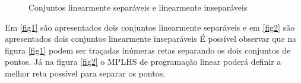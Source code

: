 \begin{figure}[!h]
\centering
{}
\qquad
{}
\label{img:linear_sepa}
\caption{Conjuntos linearmente separáveis e linearmente inseparáveis}
\end{figure}

Em \ref{fig1} são apresentados dois conjuntos linearmente separáveis e em \ref{fig2} são apresentados dois conjuntos linearmente inseparáveis
É possível observar que na figura \ref{fig1} podem ser traçadas inúmeras retas separando os dois conjuntos de pontos. Já na figura \ref{fig2} o MPLHS de programação linear poderá definir a melhor reta possível para separar os pontos.

